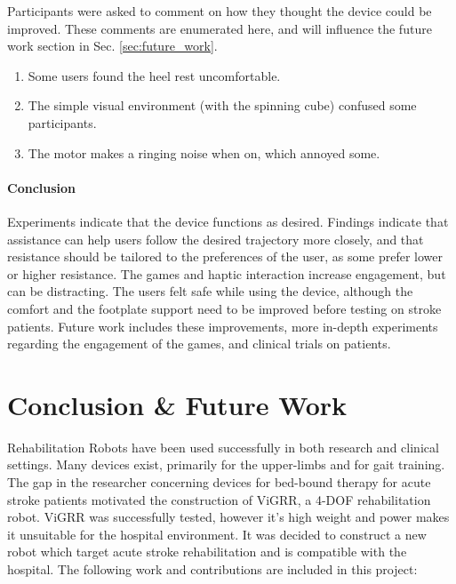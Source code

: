 \documentclass[12pt]{report}
\begin{document}
Participants were asked to comment on how they thought the device could be improved. These comments are enumerated here, and will influence the future work section in Sec. \ref{sec:future_work}. 		
		
		\begin{enumerate}
			\item Some users found the heel rest uncomfortable. 
			\item The simple visual environment (with the spinning cube) confused some participants.
			\item The motor makes a ringing noise when on, which annoyed some.
		
		
		\end{enumerate}
		
\subsubsection{Conclusion}

 Experiments indicate that the device functions as desired. Findings indicate that assistance can help users follow the desired trajectory more closely, and that resistance should be tailored to the preferences of the user, as some prefer lower or higher resistance. The games and haptic interaction increase engagement, but can be distracting. The users felt safe while using the device, although the comfort and the footplate support need to be improved before testing on stroke patients. Future work includes these improvements, more in-depth experiments regarding the engagement of the games, and clinical trials on patients. 
	
\chapter{Conclusion \& Future Work} \label{ch_conc}

	Rehabilitation Robots have been used successfully in both research and clinical settings. Many devices exist, primarily for the upper-limbs and for gait training. The gap in the researcher concerning devices for bed-bound therapy for acute stroke patients motivated the construction of ViGRR, a 4-DOF rehabilitation robot. ViGRR was successfully tested, however it's high weight and power makes it unsuitable for the hospital environment. It was decided to construct a new robot which target acute stroke rehabilitation and is compatible with the hospital. The following work and contributions are included in this project: 
	
\end{document}
